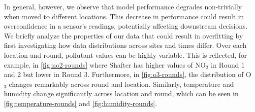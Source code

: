 \documentclass[journal abbreviation, manuscript]{copernicus}
\newcommand\todo[1]{\textcolor{red}{#1}}
\newcommand{\textus}[1]{$_{\text{#1}}$}
\begin{document}
In general, however, we observe that model performance degrades non-trivially
when moved to different locations. This decrease in performance could result in overconfidence in a sensor's readings, potentially affecting downstream decisions. We briefly analyze the properties of our data that could result in overfitting
by first investigating how data distributions across sites and times differ. Over each location and round, pollutant values can be highly variable. This is reflected, for example, in \autoref{fig:no2-rounds} where Shafter has higher values of NO\textus{2} in Round 1 and 2 but lower in Round 3. Furthermore, in \autoref{fig:o3-rounds}, the distribution of O\textus{3} changes remarkably across round and location.
Similarly, temperature and humidity change significantly across location and round, which can be seen in \autoref{fig:temperature-rounds} and \autoref{fig:humidity-rounds}.

\end{document}
